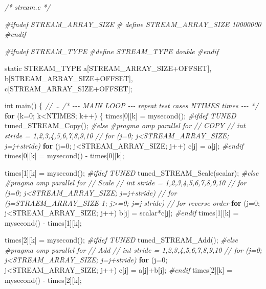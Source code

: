 \documentclass[]{ctexbook}
\newenvironment{Shaded}{\begin{snugshade}}{\end{snugshade}}
\newcommand{\CommentTok}[1]{\textcolor[rgb]{0.56,0.35,0.01}{\textit{#1}}}
\newcommand{\ControlFlowTok}[1]{\textcolor[rgb]{0.13,0.29,0.53}{\textbf{#1}}}
\newcommand{\DataTypeTok}[1]{\textcolor[rgb]{0.13,0.29,0.53}{#1}}
\newcommand{\DecValTok}[1]{\textcolor[rgb]{0.00,0.00,0.81}{#1}}
\newcommand{\NormalTok}[1]{#1}
\newcommand{\PreprocessorTok}[1]{\textcolor[rgb]{0.56,0.35,0.01}{\textit{#1}}}
\begin{document}
\begin{Shaded}
\begin{Highlighting}[]
\CommentTok{/* stream.c */}

\PreprocessorTok{\#ifndef STREAM\_ARRAY\_SIZE}
\PreprocessorTok{\#   define STREAM\_ARRAY\_SIZE    10000000}
\PreprocessorTok{\#endif}

\PreprocessorTok{\#ifndef STREAM\_TYPE}
\PreprocessorTok{\#define STREAM\_TYPE double}
\PreprocessorTok{\#endif}

\DataTypeTok{static}\NormalTok{ STREAM\_TYPE    a[STREAM\_ARRAY\_SIZE+OFFSET],}
\NormalTok{            b[STREAM\_ARRAY\_SIZE+OFFSET],}
\NormalTok{            c[STREAM\_ARRAY\_SIZE+OFFSET];}

\DataTypeTok{int}\NormalTok{ main()}
\NormalTok{    \{}
\CommentTok{// …}
    \CommentTok{/*    {-}{-}{-} MAIN LOOP {-}{-}{-} repeat test cases NTIMES times {-}{-}{-} */}
    \ControlFlowTok{for}\NormalTok{ (k=}\DecValTok{0}\NormalTok{; k\textless{}NTIMES; k++)}
\NormalTok{    \{}
\NormalTok{    times[}\DecValTok{0}\NormalTok{][k] = mysecond();}
\PreprocessorTok{\#ifdef TUNED}
\NormalTok{        tuned\_STREAM\_Copy();}
\PreprocessorTok{\#else}
\PreprocessorTok{\#pragma omp parallel for}
\CommentTok{// COPY        }
\CommentTok{//  int stride = 1,2,3,4,5,6,7,8,9,10}
\CommentTok{//    for (j=0; j\textless{}STREAM\_ARRAY\_SIZE; j=j+stride)}
    \ControlFlowTok{for}\NormalTok{ (j=}\DecValTok{0}\NormalTok{; j\textless{}STREAM\_ARRAY\_SIZE; j++)}
\NormalTok{        c[j] = a[j];}
\PreprocessorTok{\#endif}
\NormalTok{    times[}\DecValTok{0}\NormalTok{][k] = mysecond() {-} times[}\DecValTok{0}\NormalTok{][k];}

\NormalTok{    times[}\DecValTok{1}\NormalTok{][k] = mysecond();}
\PreprocessorTok{\#ifdef TUNED}
\NormalTok{        tuned\_STREAM\_Scale(scalar);}
\PreprocessorTok{\#else}
\PreprocessorTok{\#pragma omp parallel for}
\CommentTok{// Scale        }
\CommentTok{//  int stride = 1,2,3,4,5,6,7,8,9,10}
\CommentTok{//    for (j=0; j\textless{}STREAM\_ARRAY\_SIZE; j=j+stride)}
\CommentTok{//    for (j=STRAEM\_ARRAY\_SIZE{-}1; j\textgreater{}=0; j=j{-}stride)  // for reverse order}
    \ControlFlowTok{for}\NormalTok{ (j=}\DecValTok{0}\NormalTok{; j\textless{}STREAM\_ARRAY\_SIZE; j++)}
\NormalTok{        b[j] = scalar*c[j];}
\PreprocessorTok{\#endif}
\NormalTok{    times[}\DecValTok{1}\NormalTok{][k] = mysecond() {-} times[}\DecValTok{1}\NormalTok{][k];}

\NormalTok{    times[}\DecValTok{2}\NormalTok{][k] = mysecond();}
\PreprocessorTok{\#ifdef TUNED}
\NormalTok{        tuned\_STREAM\_Add();}
\PreprocessorTok{\#else}
\PreprocessorTok{\#pragma omp parallel for}
\CommentTok{// Add        }
\CommentTok{//  int stride = 1,2,3,4,5,6,7,8,9,10}
\CommentTok{//    for (j=0; j\textless{}STREAM\_ARRAY\_SIZE; j=j+stride)}
    \ControlFlowTok{for}\NormalTok{ (j=}\DecValTok{0}\NormalTok{; j\textless{}STREAM\_ARRAY\_SIZE; j++)}
\NormalTok{        c[j] = a[j]+b[j];}
\PreprocessorTok{\#endif}
\NormalTok{    times[}\DecValTok{2}\NormalTok{][k] = mysecond() {-} times[}\DecValTok{2}\NormalTok{][k];}


\end{Highlighting}
\end{Shaded}
\end{document}
